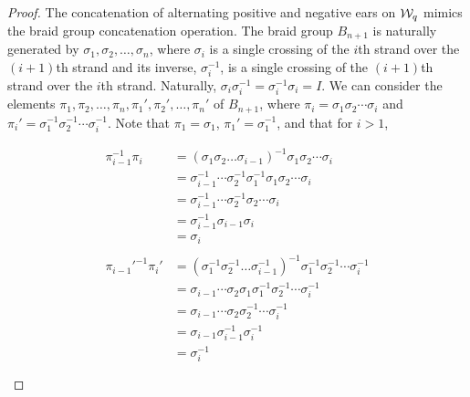 \documentclass[paper.tex]{subfiles}
\begin{document}
\begin{proof}

    The concatenation of alternating positive and negative ears on $\mathcal{W}_q$ mimics the braid group concatenation operation. The braid group $B_{n+1}$ is naturally generated by $\sigma_1, \sigma_2, \dots, \sigma_{n}$, where $\sigma_i$ is a single crossing of the $i$th strand over the $(i + 1)$th strand and its inverse, $\sigma_i^{-1}$, is a single crossing of the $(i + 1)$th strand over the $i$th strand. Naturally, $\sigma_i \sigma_i^{-1} = \sigma_i^{-1} \sigma_i = I$. We can consider the elements $\pi_1, \pi_2, \dots, \pi_n, \pi_1', \pi_2', \dots, \pi_n'$ of $B_{n+1}$, where $\pi_i = \sigma_1 \sigma_2 \cdots \sigma_i$ and $\pi_i' = \sigma_1^{-1} \sigma_2^{-1} \cdots \sigma_i^{-1}$. Note that $\pi_1 = \sigma_1$, $\pi_1' = \sigma_1^{-1}$, and that for $i > 1$, 
    
    \begin{align*}
        \pi_{i-1}^{-1} \pi_i  &= (\sigma_1 \sigma_2 \dots \sigma_{i - 1})^{-1} \sigma_1 \sigma_2 \cdots \sigma_i \\ 
                              &= \sigma_{i - 1}^{-1} \cdots \sigma_2^{-1} \sigma_1^{-1} \sigma_1 \sigma_2 \cdots \sigma_i \\
                              &= \sigma_{i - 1}^{-1} \cdots \sigma_2^{-1} \sigma_2 \cdots \sigma_i \\
                              &= \sigma_{i - 1}^{-1} \sigma_{i - 1} \sigma_i  \\
                              &= \sigma_i \\ \\
        \pi_{i-1}'^{-1} \pi_i'  &= (\sigma_1^{-1} \sigma_2^{-1} \dots \sigma_{i - 1}^{-1})^{-1} \sigma_1^{-1} \sigma_2^{-1} \cdots \sigma_i^{-1} \\ 
                                &= \sigma_{i - 1} \cdots \sigma_2 \sigma_1 \sigma_1^{-1} \sigma_2^{-1} \cdots \sigma_i^{-1} \\
                                &= \sigma_{i - 1} \cdots \sigma_2 \sigma_2^{-1} \cdots \sigma_i^{-1} \\
                                &= \sigma_{i - 1} \sigma_{i - 1}^{-1} \sigma_i^{-1}  \\
                                &= \sigma_i^{-1} \\ \\
    \end{align*}


\end{proof}
\end{document}
